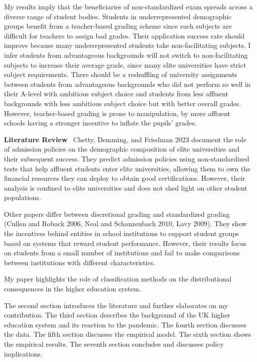 My results imply that the beneficiaries of non-standardized exam spreads across a diverse range of student bodies. Students in underrepresented demographic groups benefit from a teacher-based grading scheme since such subjects are difficult for teachers to assign bad grades. Their application success rate should improve because many underrepresented students take non-facilitating subjects. I infer students from advantageous backgrounds will not switch to non-facilitating subjects to increase their average grade, since many elite universities have strict subject requirements. There should be a reshuffling of university assignments between students from advantageous backgrounds who did not perform so well in their A-level with ambitious subject choice and students from less affluent backgrounds with less ambitious subject choice but with better overall grades. However, teacher-based grading is prone to manipulation, by more affluent schools having a stronger incentive to inflate the pupils' grades. 

\vspace{1em}


\textbf{Literature Review}  \ Chetty, Demming, and Friedman 2023 document the role of admission policies on the demographic composition of elite universities and their subsequent success. They predict admission policies using non-standardized tests that help affluent students enter elite universities, allowing them to own the financial resources they can deploy to obtain good certifications. However, their analysis is confined to elite universities and does not shed light on other student populations. 

Other papers differ between discretional grading and standardized grading (Cullen and Roback 2006, Neal and Schanzenbach 2010, Lavy 2009). They show the incentives behind entities in school institutions to support student groups based on systems that reward student performance. However, their results focus on students from a small number of institutions and fail to make comparisons between institutions with different characteristics. 

My paper highlights the role of classification methods on the distributional consequences in the higher education system.

The second section introduces the literature and further elaborates on my contribution. The third section describes the background of the UK higher education system and its reaction to the pandemic. The fourth section discusses the data. The fifth section discusses the empirical model. The sixth section shows the empirical results. The seventh section concludes and discusses policy implications.
